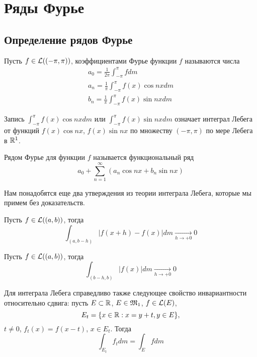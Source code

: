 \documentclass[main]{subfiles}
\begin{document}
\chapter{Ряды Фурье}
\section{Определение рядов Фурье}
\begin{definition}
    Пусть $f \in \mathcal{L}((-\pi, \pi))$, коэффициентами Фурье функции $f$ называются числа
    \[\begin{gathered}
            a_0 = \frac{1}{2 \pi} \int_{-\pi}^{\pi} fdm \\
            a_n = \frac{1}{\pi} \int_{-\pi}^{\pi} f(x) \cos nx dm \\
            b_n = \frac{1}{\pi} \int_{-\pi}^{\pi} f(x) \sin nx dm
        \end{gathered} \tag{1}\]
\end{definition}
Запись $\int_{-\pi}^{\pi} f(x) \cos nx dm$ или $\int_{-\pi}^{\pi} f(x) \sin nx dm$ означает интеграл Лебега от функций $f(x) \cos nx$, $f(x) \sin nx$ по множеству $(-\pi, \pi)$ по мере Лебега в $\mathbb{R}^1$.
\begin{definition}
    Рядом Фурье для функции $f$ называется функциональный ряд
    \[a_0 + \sum_{n=1}^{\infty} (a_n \cos nx + b_n \sin nx)\]
\end{definition}

Нам понадобятся еще два утверждения из теории интеграла Лебега, которые мы примем без доказательств.
\begin{proposition}
    Пусть $f \in \mathcal{L}((a, b))$, тогда
    \[\int_{(a, b-h)} |f(x+h) - f(x)| dm \xrightarrow[h \to +0]{} 0 \tag{2}\]
\end{proposition}

\begin{proposition}
    Пусть $f \in \mathcal{L}((a, b))$, тогда
    \[\int_{(b-h, b)} |f(x)| dm \xrightarrow[h \to +0]{} 0 \tag{3}\]
\end{proposition}

Для интеграла Лебега справедливо также следующее свойство инвариантности относительно сдвига: пусть $E \subset \mathbb{R}$, $E \in \mathfrak{M}_1$, $f \in \mathcal{L}(E)$,
\[E_t = \{x \in \mathbb{R}: x = y+t, y \in E\},\]
$t \neq 0$, $f_t(x) = f(x-t)$, $x \in E_t$.
Тогда
\[\int_{E_t} f_t dm = \int_E f dm \tag{4}\]
\end{document}
